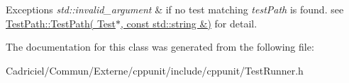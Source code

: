 \begin{DoxyExceptions}{Exceptions}
{\em std\-::invalid\-\_\-argument} & if no test matching {\itshape test\-Path} is found. see \hyperlink{class_test_path_a5855701e39a328a19f9780a130106cb3}{Test\-Path\-::\-Test\-Path( Test$\ast$, const std\-::string \&)} for detail. \\
\hline
\end{DoxyExceptions}


The documentation for this class was generated from the following file\-:\begin{DoxyCompactItemize}
\item 
Cadriciel/\-Commun/\-Externe/cppunit/include/cppunit/Test\-Runner.\-h\end{DoxyCompactItemize}
